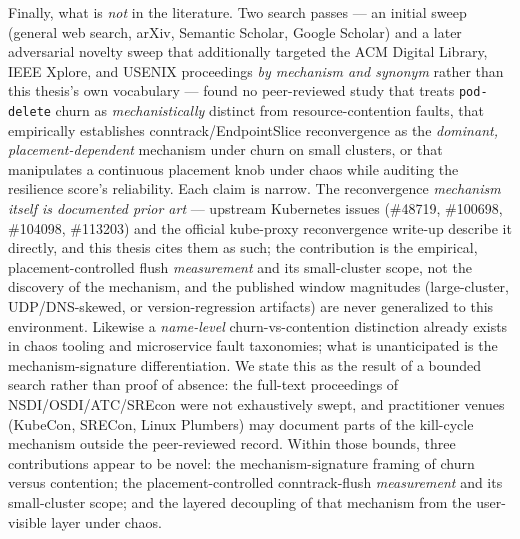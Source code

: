 Finally, what is \emph{not} in the literature. Two search passes --- an initial
sweep (general web search, arXiv, Semantic Scholar, Google Scholar) and a later
adversarial novelty sweep that additionally targeted the ACM Digital Library,
IEEE Xplore, and USENIX proceedings \emph{by mechanism and synonym} rather than
this thesis's own vocabulary --- found no peer-reviewed study that treats
\texttt{pod-delete} churn as \emph{mechanistically} distinct from
resource-contention faults, that empirically establishes
conntrack/EndpointSlice reconvergence as the \emph{dominant, placement-dependent}
mechanism under churn on small clusters, or that manipulates a continuous
placement knob under chaos while auditing the resilience score's reliability.
Each claim is narrow. The reconvergence \emph{mechanism itself is documented
prior art} --- upstream Kubernetes issues (\#48719, \#100698, \#104098,
\#113203) and the official kube-proxy reconvergence write-up describe it
directly, and this thesis cites them as such; the contribution is the empirical,
placement-controlled flush \emph{measurement} and its small-cluster scope, not
the discovery of the mechanism, and the published window magnitudes
(large-cluster, UDP/DNS-skewed, or version-regression artifacts) are never
generalized to this environment. Likewise a \emph{name-level} churn-vs-contention
distinction already exists in chaos tooling and microservice fault taxonomies;
what is unanticipated is the mechanism-signature differentiation. We state this
as the result of a bounded search rather than proof of absence: the full-text
proceedings of NSDI/OSDI/ATC/SREcon were not exhaustively swept, and practitioner
venues (KubeCon, SRECon, Linux Plumbers) may document parts of the kill-cycle
mechanism outside the peer-reviewed record. Within those bounds, three contributions appear
to be novel: the mechanism-signature framing of churn versus contention; the
placement-controlled conntrack-flush \emph{measurement} and its small-cluster
scope; and the layered decoupling of that mechanism from the user-visible layer
under chaos.
